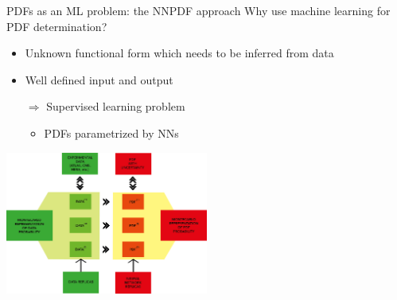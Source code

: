 \documentclass[aspectratio=169,10pt]{beamer}
\begin{document}
\begin{frame}{PDFs as an ML problem: the NNPDF approach}
   	Why use machine learning for PDF determination?
    \begin{itemize}
        \item Unknown functional form which needs to be inferred from data
        \item Well defined input and output
        \item[$\Rightarrow$] Supervised learning problem
        \begin{itemize}
            \item PDFs parametrized by NNs
        \end{itemize}
    \end{itemize}
    \vspace*{1em}
\begin{center}
\vspace*{-1cm}
\includegraphics[width=0.5\textwidth]{intro/NNPDF_MC_strategy}
\end{center}
\end{frame}


%
%
\end{document}
